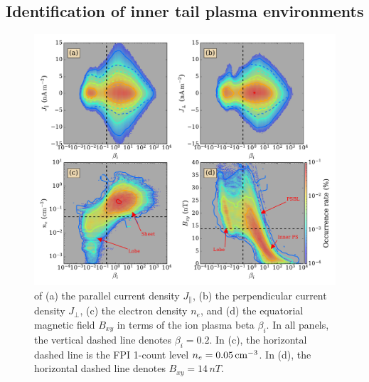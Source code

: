 \documentclass[draft]{agujournal2019}
\begin{document}
\subsection{Identification of inner tail plasma
environments}\label{sec:tail_environments}

\begin{figure}
\centering
\noindent\includegraphics[width=\textwidth]{Fig3_compare_B14.pdf}
\caption{
     of (a) the parallel current density $J_\|$, (b) the perpendicular current density $J_\perp$, (c) the electron density $n_e$, and (d) the equatorial magnetic field $B_{xy}$ in terms of the ion plasma beta $\beta_i$.  In all panels, the vertical dashed line denotes ${\beta_i=0.2}$. In (c), the horizontal dashed line is the FPI 1-count level ${n_e=0.05\,\si{cm\tothe{-3}}}$. In (d), the horizontal dashed line denotes ${B_{xy}=14\,\si{nT}}$. 
}
\label{fig:compare_B14}
\end{figure}
\end{document}
